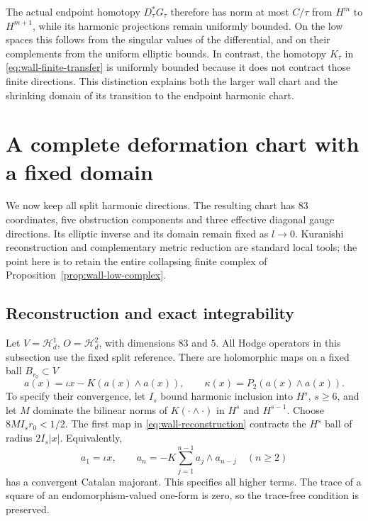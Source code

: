 \documentclass[11pt]{amsart}
\theoremstyle{definition}
\theoremstyle{remark}
\newcommand{\cH}{\mathcal H}
\begin{document}
The actual endpoint homotopy $D_\tau^*G_{\tau}$ therefore has norm
at most $C/\tau$ from $H^m$ to $H^{m+1}$, while its harmonic
projections remain uniformly bounded. On the low spaces this follows
from the singular values of the differential, and on their complements
from the uniform elliptic bounds. In contrast, the homotopy $K_\tau$
in \eqref{eq:wall-finite-transfer} is uniformly bounded because it
does not contract those finite directions. This distinction explains
both the larger wall chart and the shrinking domain of its transition
to the endpoint harmonic chart.

\section{A complete deformation chart with a fixed domain}\label{sec:wall-chart}

We now keep all split harmonic directions. The resulting chart has
$83$ coordinates, five obstruction components and three effective
diagonal gauge directions. Its elliptic inverse and its domain remain
fixed as $l\to0$. Kuranishi reconstruction and complementary metric
reduction are standard local tools; the point here is to retain the
entire collapsing finite complex of Proposition~\ref{prop:wall-low-complex}.

\subsection{Reconstruction and exact integrability}
Let $V=\cH^1_d$, $O=\cH^2_d$, with dimensions $83$ and $5$.
All Hodge operators in this subsection use the fixed split reference.
There are holomorphic maps on a fixed ball $B_{r_0}\subset V$
\begin{equation}\label{eq:wall-reconstruction}
 a(x)=\iota x-K(a(x)\wedge a(x)),\qquad
 \kappa(x)=P_2(a(x)\wedge a(x)).
\end{equation}
To specify their convergence, let $I_s$ bound harmonic inclusion into
$H^s$, $s\ge6$, and let $M$ dominate the bilinear norms of
$K(\cdot\wedge\cdot)$ in $H^s$ and $H^{s-1}$. Choose
$8MI_sr_0<1/2$. The first map in \eqref{eq:wall-reconstruction}
contracts the $H^s$ ball of radius $2I_s|x|$. Equivalently,
\[
 a_1=\iota x,\qquad
 a_n=-K\sum_{j=1}^{n-1}a_j\wedge a_{n-j}\quad(n\ge2)
\]
has a convergent Catalan majorant. This specifies all higher terms.
The trace of a square of an endomorphism-valued one-form is zero,
so the trace-free condition is preserved.
\end{document}
